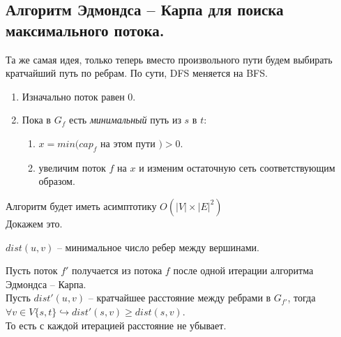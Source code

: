 \subsection{Алгоритм Эдмондса -- Карпа для поиска максимального потока.}
Та же самая идея, только теперь вместо произвольного пути будем выбирать кратчайший путь по ребрам. По сути, DFS меняется на BFS.
\begin{enumerate}
	\item Изначально поток равен 0.
	\item Пока в $G_f$ есть \textit{минимальный} путь из $s $ в $t$:
		\begin{enumerate}
			\item $x = min(cap_f$ на этом пути $) > 0$.
			\item  увеличим поток $f$ на  $x$  и изменим остаточную сеть соответствующим образом.
		\end{enumerate}
\end{enumerate}

Алгоритм будет иметь асимптотику $O(\lvert V \rvert \times \lvert E \rvert ^ 2)$ \\

Докажем это.
\begin{Def}
	$dist(u, v)$ -- минимальное число ребер между вершинами.
\end{Def}

\begin{lemma}
	Пусть поток $f'$ получается из потока $f$ после одной итерации алгоритма Эдмондса -- Карпа. \\
	Пусть $dist'(u, v)$ -- кратчайшее расстояние между ребрами в $G_{f'}$, тогда
	$\forall v \in V \{s, t\} \hookrightarrow dist'(s, v) \geq dist(s, v)$.  \\
	То есть с каждой итерацией расстояние не убывает.
\end{lemma}

